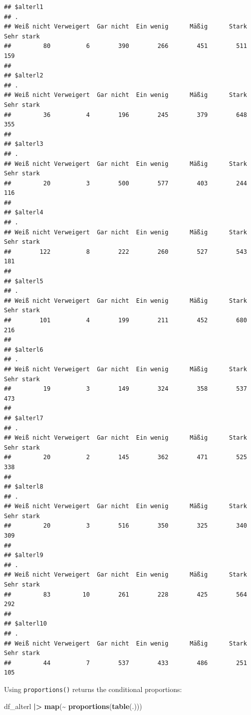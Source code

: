 \documentclass[
  doc]{apa6}
\newenvironment{Shaded}{\begin{snugshade}}{\end{snugshade}}
\newcommand{\FunctionTok}[1]{\textcolor[rgb]{0.13,0.29,0.53}{\textbf{#1}}}
\newcommand{\NormalTok}[1]{#1}
\newcommand{\SpecialCharTok}[1]{\textcolor[rgb]{0.81,0.36,0.00}{\textbf{#1}}}
\begin{document}
\begin{verbatim}
## $alterl1
## .
## Weiß nicht Verweigert  Gar nicht  Ein wenig      Mäßig      Stark Sehr stark 
##         80          6        390        266        451        511        159 
## 
## $alterl2
## .
## Weiß nicht Verweigert  Gar nicht  Ein wenig      Mäßig      Stark Sehr stark 
##         36          4        196        245        379        648        355 
## 
## $alterl3
## .
## Weiß nicht Verweigert  Gar nicht  Ein wenig      Mäßig      Stark Sehr stark 
##         20          3        500        577        403        244        116 
## 
## $alterl4
## .
## Weiß nicht Verweigert  Gar nicht  Ein wenig      Mäßig      Stark Sehr stark 
##        122          8        222        260        527        543        181 
## 
## $alterl5
## .
## Weiß nicht Verweigert  Gar nicht  Ein wenig      Mäßig      Stark Sehr stark 
##        101          4        199        211        452        680        216 
## 
## $alterl6
## .
## Weiß nicht Verweigert  Gar nicht  Ein wenig      Mäßig      Stark Sehr stark 
##         19          3        149        324        358        537        473 
## 
## $alterl7
## .
## Weiß nicht Verweigert  Gar nicht  Ein wenig      Mäßig      Stark Sehr stark 
##         20          2        145        362        471        525        338 
## 
## $alterl8
## .
## Weiß nicht Verweigert  Gar nicht  Ein wenig      Mäßig      Stark Sehr stark 
##         20          3        516        350        325        340        309 
## 
## $alterl9
## .
## Weiß nicht Verweigert  Gar nicht  Ein wenig      Mäßig      Stark Sehr stark 
##         83         10        261        228        425        564        292 
## 
## $alterl10
## .
## Weiß nicht Verweigert  Gar nicht  Ein wenig      Mäßig      Stark Sehr stark 
##         44          7        537        433        486        251        105
\end{verbatim}

Using \texttt{proportions()} returns the conditional proportions:

\begin{Shaded}
\begin{Highlighting}[]
\NormalTok{df\_alterl }\SpecialCharTok{|\textgreater{}} 
  \FunctionTok{map}\NormalTok{(}\SpecialCharTok{\textasciitilde{}} \FunctionTok{proportions}\NormalTok{(}\FunctionTok{table}\NormalTok{(.)))}
\end{Highlighting}
\end{Shaded}
\end{document}
